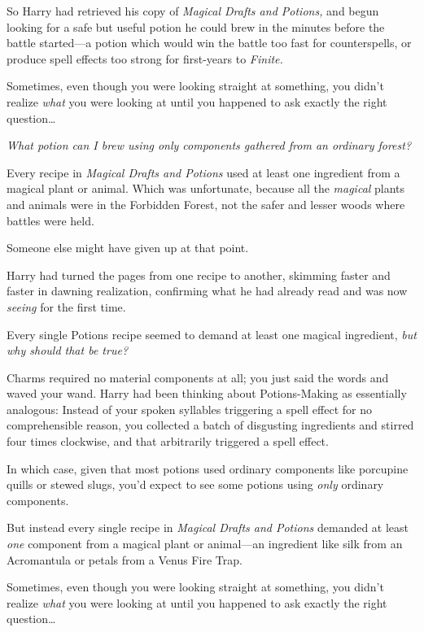So Harry had retrieved his copy of \emph{Magical Drafts and Potions,} and begun 
looking for a safe but useful potion he could brew in the minutes before the 
battle started---a potion which would win the battle too fast for 
counterspells, or produce spell effects too strong for first-years to 
\emph{Finite.}

Sometimes, even though you were looking straight at something, you didn't 
realize \emph{what} you were looking at until you happened to ask exactly the 
right question{\ldots}

\emph{What potion can I brew using only components gathered from an ordinary 
forest?}

Every recipe in \emph{Magical Drafts and Potions} used at least one ingredient 
from a magical plant or animal. Which was unfortunate, because all the 
\emph{magical} plants and animals were in the Forbidden Forest, not the safer 
and lesser woods where battles were held.

Someone else might have given up at that point.

Harry had turned the pages from one recipe to another, skimming faster and 
faster in dawning realization, confirming what he had already read and was now 
\emph{seeing} for the first time.

Every single Potions recipe seemed to demand at least one magical ingredient, 
\emph{but why should that be true?}

Charms required no material components at all; you just said the words and 
waved your wand. Harry had been thinking about Potions-Making as essentially 
analogous: Instead of your spoken syllables triggering a spell effect for no 
comprehensible reason, you collected a batch of disgusting ingredients and 
stirred four times clockwise, and that arbitrarily triggered a spell effect.

In which case, given that most potions used ordinary components like porcupine 
quills or stewed slugs, you'd expect to see some potions using \emph{only} 
ordinary components.

But instead every single recipe in \emph{Magical Drafts and Potions} demanded 
at least \emph{one} component from a magical plant or animal---an ingredient 
like silk from an Acromantula or petals from a Venus Fire Trap.

Sometimes, even though you were looking straight at something, you didn't 
realize \emph{what} you were looking at until you happened to ask exactly the 
right question{\ldots}

